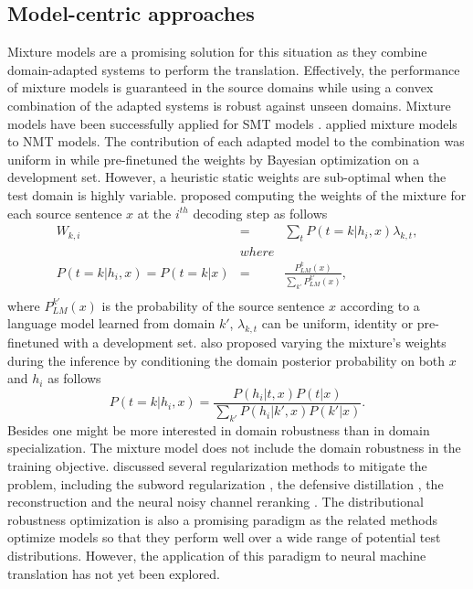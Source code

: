 \subsection{Model-centric approaches}
Mixture models are a promising solution for this situation as they combine domain-adapted systems to perform the translation. Effectively, the performance of mixture models is guaranteed in the source domains while using a convex combination of the adapted systems is robust against unseen domains. Mixture models have been successfully applied for SMT models \citep{Sennrich12mixture,Sennrich12perplexity,Carpuat14linear}. \citet{Freitag16fast, Sajjad17neural, Saunders19domain} applied mixture models to NMT models. The contribution of each adapted model to the combination was uniform in \citet{Freitag16fast} while \citet{Sajjad17neural} pre-finetuned the weights by Bayesian optimization on a development set. However, a heuristic static weights are sub-optimal when the test domain is highly variable. \citet{Saunders19domain} proposed computing the weights of the mixture for each source sentence $x$ at the $i^{th}$ decoding step as follows
\begin{equation}
\begin{array}{rcl}
W_{k,i} &=& \displaystyle{\mathop{\sum}_{t} P(t=k|h_i,x)\lambda_{k,t}}, \\
&where& \\
P(t=k|h_i,x) = P(t=k|x) &=& \frac{\displaystyle{P^k_{LM}(x)}}{\displaystyle{\mathop{\sum}_{k'} P^{k'}_{LM}(x)}},\\
\end{array}
\end{equation}
where $P^{k'}_{LM}(x)$ is the probability of the source sentence $x$ according to a language model learned from domain $k'$, $\lambda_{k,t}$ can be uniform, identity or pre-finetuned with a development set. \citet{Saunders19domain} also proposed varying the mixture's weights during the inference by conditioning the domain posterior probability on both $x$ and $h_i$ as follows
\begin{equation}
P(t=k|h_i,x) = \frac{P(h_i|t,x) P(t|x)}{\displaystyle{\mathop{\sum}_{k'} P(h_i|k',x) P(k'|x)}}.
\end{equation} 
Besides one might be more interested in domain robustness than in domain specialization. The mixture model does not include the domain robustness in the training objective. \citet{Muller20domain} discussed several regularization methods to mitigate the problem, including the subword regularization \citep{Taku18subword}, the defensive distillation \citep{Papernot16distillation}, the reconstruction \citep{Tu17neural} and the neural noisy channel reranking \citep{Li16mutual}. The distributional robustness optimization \citep{BenTal13robust,Oren19distributionally} is also a promising paradigm as the related methods optimize models so that they perform well over a wide range of potential test distributions. However, the application of this paradigm to neural machine translation has not yet been explored.
